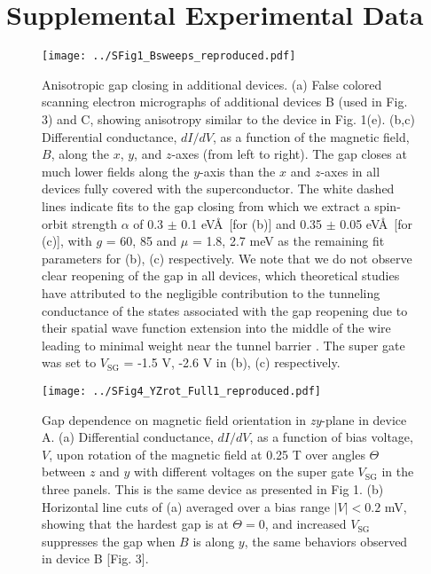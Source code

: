 \section{Supplemental Experimental Data}
\begin{figure}[h!]
\centering
\texttt{[image: ../SFig1\_Bsweeps\_reproduced.pdf]}
\caption{\label{fig:BsweepsReproduced}
    Anisotropic gap closing in additional devices. 
    (a) False colored scanning electron micrographs of additional devices B (used in Fig. 3) and C, showing anisotropy similar to the device in Fig. 1(e). (b,c) Differential conductance, $dI/dV$, as a function of the magnetic field, $B$, along the $x$, $y$, and $z$-axes (from left to right). The gap closes at much lower fields along the $y$-axis than the $x$ and $z$-axes in all devices fully covered with the superconductor. The white dashed lines indicate fits to the gap closing from which we extract a spin-orbit strength $\alpha$ of 0.3 $\pm$ 0.1 eV\AA\ [for (b)] and 0.35 $\pm$ 0.05 eV\AA\ [for (c)], with $g$ = 60, 85 and $\mu$ = 1.8, 2.7 meV as the remaining fit parameters for (b), (c) respectively. We note that we do not observe clear reopening of the gap in all devices, which theoretical studies have attributed to the negligible contribution to the tunneling conductance of the states associated with the gap reopening due to their spatial wave function extension into the middle of the wire leading to minimal weight near the tunnel barrier \cite{Prada2012,Pientka2012,Stanescu2012,Liu2019}. The super gate was set to $V_{\mathrm{SG}}$ = -1.5 V, -2.6 V in (b), (c) respectively.
}
\end{figure}

\begin{figure}[p!]
\centering
\texttt{[image: ../SFig4\_YZrot\_Full1\_reproduced.pdf]}
\caption{\label{fig:YZrotRep}
    Gap dependence on magnetic field orientation in \textit{zy}-plane in device A. 
    (a) Differential conductance, $dI/dV$, as a function of bias voltage, $V$, upon rotation of the magnetic field at 0.25 T over angles $\Theta$ between $z$ and $y$ with different voltages on the super gate $V_{\mathrm{SG}}$ in the three panels. This is the same device as presented in Fig 1. (b) Horizontal line cuts of (a) averaged over a bias range $|V| < 0.2$ mV, showing that the hardest gap is at $\Theta = 0$, and increased $V_{\mathrm{SG}}$ suppresses the gap when $B$ is along $y$, the same behaviors observed in device B [Fig. 3].
}
\end{figure}

